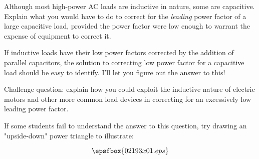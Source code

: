 

Although most high-power AC loads are inductive in nature, some are capacitive.  Explain what you would have to do to correct for the {\it leading} power factor of a large capacitive load, provided the power factor were low enough to warrant the expense of equipment to correct it.







If inductive loads have their low power factors corrected by the addition of parallel capacitors, the solution to correcting low power factor for a capacitive load should be easy to identify.  I'll let you figure out the answer to this!

\vskip 10pt

Challenge question: explain how you could exploit the inductive nature of electric motors and other more common load devices in correcting for an excessively low leading power factor.







If some students fail to understand the answer to this question, try drawing an "upside-down" power triangle to illustrate:

$$\epsfbox{02193x01.eps}$$




